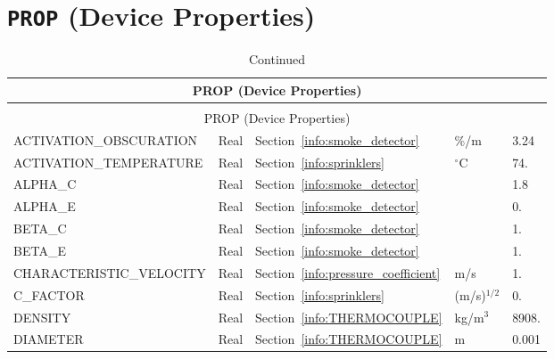 \documentclass[11pt]{book}
\begin{document}
\section{\texorpdfstring{{\tt PROP}}{PROP} (Device Properties)}


\begin{longtable}{@{\extracolsep{\fill}}|l|l|l|l|l|}
\caption[Device properties ({\ct PROP} namelist group)]{For more information see Section~\ref{info:PROP}.}
\label{tbl:PROP} \\
\hline
\multicolumn{5}{|c|}{{\ct PROP} (Device Properties)} \\
\hline \hline
\endfirsthead
\caption[]{Continued} \\
\hline
\multicolumn{5}{|c|}{{\ct PROP} (Device Properties)} \\
\hline \hline
\endhead
{\ct ACTIVATION\_OBSCURATION}           & Real          & Section~\ref{info:smoke_detector}         & \%/m                  & 3.24      \\ \hline
{\ct ACTIVATION\_TEMPERATURE}           & Real          & Section~\ref{info:sprinklers}             & $^\circ$C             & 74.        \\ \hline
{\ct ALPHA\_C}                          & Real          & Section~\ref{info:smoke_detector}         &                       & 1.8       \\ \hline
{\ct ALPHA\_E}                          & Real          & Section~\ref{info:smoke_detector}         &                       & 0.       \\ \hline
{\ct BETA\_C}                           & Real          & Section~\ref{info:smoke_detector}         &                       & 1.       \\ \hline
{\ct BETA\_E}                           & Real          & Section~\ref{info:smoke_detector}         &                       & 1.       \\ \hline
{\ct CHARACTERISTIC\_VELOCITY}          & Real          & Section~\ref{info:pressure_coefficient}   & m/s                   & 1.       \\ \hline
{\ct C\_FACTOR}                         & Real          & Section~\ref{info:sprinklers}             & (m/s)$^{1/2}$         & 0.        \\ \hline
{\ct DENSITY}                           & Real          & Section~\ref{info:THERMOCOUPLE}           & kg/m$^3$              & 8908.     \\ \hline
{\ct DIAMETER}                          & Real          & Section~\ref{info:THERMOCOUPLE}           & m                     & 0.001     \\ \hline

\end{longtable}
\end{document}

